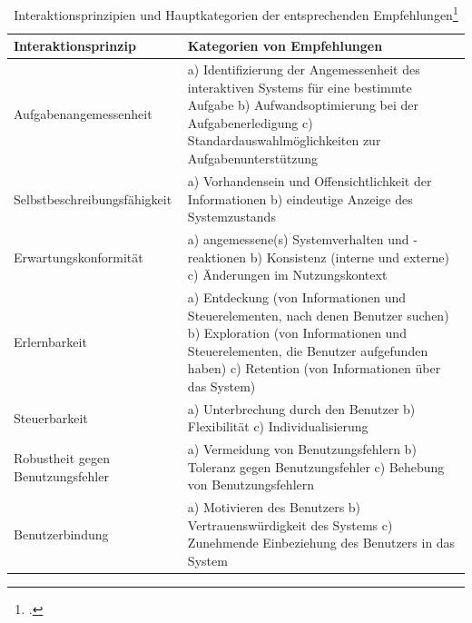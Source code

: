 \newpage
\begin{table}[htbp]
	\centering
	\caption[Interaktionsprinzipien und Hauptkategorien der entsprechenden Empfehlungen]{Interaktionsprinzipien und Hauptkategorien der entsprechenden Empfehlungen\footcite[Enthalten in:][Tabelle 1]{DIN_ISO_9241-110:2020}}
	\label{tab:interaktionsprinzipien}
	\begin{tabularx}{0.98\textwidth}{|l|>{\RaggedRight}X|}
		\hline
		\textbf{Interaktionsprinzip} & \textbf{Kategorien von Empfehlungen} \\
		\hline
		Aufgabenangemessenheit &
		a) Identifizierung der Angemessenheit des interaktiven Systems für eine bestimmte Aufgabe \newline
		b) Aufwandsoptimierung bei der Aufgabenerledigung \newline
		c) Standardauswahlmöglichkeiten zur Aufgabenunterstützung \\
		\hline
		Selbstbeschreibungs\-fähigkeit &
		a) Vorhandensein und Offensichtlichkeit der Informationen \newline
		b) eindeutige Anzeige des Systemzustands \\
		\hline
		Erwartungskonformität &
		a) angemessene(s) Systemverhalten und -reaktionen \newline
		b) Konsistenz (interne und externe) \newline
		c) Änderungen im Nutzungskontext \\
		\hline
		Erlernbarkeit &
		a) Entdeckung (von Informationen und Steuerelementen, nach denen Benutzer suchen) \newline
		b) Exploration (von Informationen und Steuerelementen, die Benutzer aufgefunden haben) \newline
		c) Retention (von Informationen über das System) \\
		\hline
		Steuerbarkeit &
		a) Unterbrechung durch den Benutzer \newline
		b) Flexibilität \newline
		c) Individualisierung \\
		\hline
		Robustheit gegen Benutzungsfehler &
		a) Vermeidung von Benutzungsfehlern \newline
		b) Toleranz gegen Benutzungsfehler \newline
		c) Behebung von Benutzungsfehlern \\
		\hline
		Benutzerbindung &
		a) Motivieren des Benutzers \newline
		b) Vertrauenswürdigkeit des Systems \newline
		c) Zunehmende Einbeziehung des Benutzers in das System \\
		\hline
	\end{tabularx}
\end{table}

